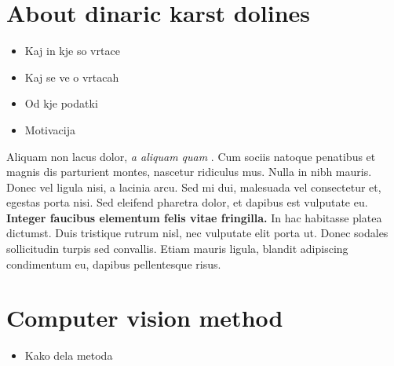 \documentclass[a0,portrait]{a0poster}
\begin{document}
\begin{multicols}{2}
\section*{About dinaric karst dolines}

\begin{itemize}
	\item Kaj in kje so vrtace
	\item Kaj se ve o vrtacah
	\item Od kje podatki
	\item Motivacija
\end{itemize}

Aliquam non lacus dolor, \textit{a aliquam quam} \cite{Smith:2012qr}. Cum sociis natoque penatibus et magnis dis parturient montes, nascetur ridiculus mus. Nulla in nibh mauris. Donec vel ligula nisi, a lacinia arcu. Sed mi dui, malesuada vel consectetur et, egestas porta nisi. Sed eleifend pharetra dolor, et dapibus est vulputate eu. \textbf{Integer faucibus elementum felis vitae fringilla.} In hac habitasse platea dictumst. Duis tristique rutrum nisl, nec vulputate elit porta ut. Donec sodales sollicitudin turpis sed convallis. Etiam mauris ligula, blandit adipiscing condimentum eu, dapibus pellentesque risus.


\color{DarkSlateGray} %

\section*{Computer vision method}

\begin{itemize}
	\item Kako dela metoda
\end{itemize}


\end{multicols}
\end{document}
